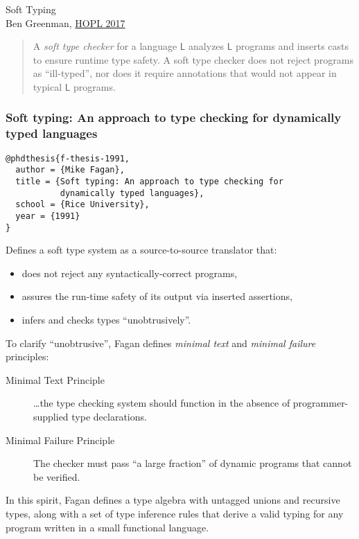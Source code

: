 \documentclass{article}
\renewcommand{\maketitle}[2]{\begin{center}{\large \textsf{#1} } \\[1ex] \textsf{#2, \href{http://www.ccs.neu.edu/home/matthias/7480-s17/index.html}{HOPL 2017}} \end{center}}
\begin{document}
\maketitle{Soft Typing}{Ben Greenman}

\begin{abstract}
  A \emph{soft type checker} for a language $\mathsf{L}$ analyzes $\mathsf{L}$
  programs and inserts casts to ensure runtime type safety.
  A soft type checker does not reject programs as ``ill-typed'', nor does it
  require annotations that would not appear in typical $\mathsf{L}$ programs.
\end{abstract}

\subsubsection*{Soft typing: An approach to type checking for dynamically typed languages}
\begin{verbatim}
@phdthesis{f-thesis-1991,
  author = {Mike Fagan},
  title = {Soft typing: An approach to type checking for
           dynamically typed languages},
  school = {Rice University},
  year = {1991}
}
\end{verbatim}

Defines a soft type system as a source-to-source translator that:
\begin{itemize}
\item does not reject any syntactically-correct programs,
\item assures the run-time safety of its output via inserted assertions,
\item infers and checks types ``unobtrusively''.
\end{itemize}

To clarify ``unobtrusive'', Fagan defines \emph{minimal text} and \emph{minimal
failure} principles:
\begin{description}
\item[Minimal Text Principle]
  \ldots the type checking system should function in the absence of
  programmer-supplied type declarations.
\item[Minimal Failure Principle]
  The checker must pass ``a large fraction'' of dynamic programs that cannot
  be verified.
\end{description}

In this spirit, Fagan defines a type algebra with untagged unions and recursive
types, along with a set of type inference rules that derive a valid typing
for any program written in a small functional language.
\end{document}
